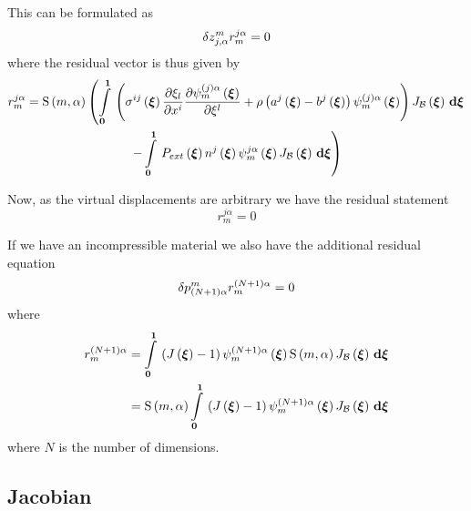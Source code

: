 This can be formulated as
\begin{equation}
  \variationdir{z_{j,\alpha}^{m}}r_{m}^{j\alpha}=0
\end{equation}
where the residual vector is thus given by
\begin{multline}
  r_{m}^{j\alpha}=\gsf{m}{\alpha}\left(
    \gint{\vectr{0}}{\vectr{1}}{\pbrac{\fnof{\sigma^{ij}}{\vectr{\xi}}\delby{\xi_{l}}{x^{i}}\delby{
          \idxgbfn{\pbrac{j}}{m}{\alpha}{\vectr{\xi}}}{\xi^{l}}+\rho\pbrac{
        \fnof{a^{j}}{\vectr{\xi}}-\fnof{b^{j}}{\vectr{\xi}}}\idxgbfn{\pbrac{j}}{m}{\alpha}{\vectr{\xi}}}
      \fnof{J_{\embedmanifold{B}}}{\vectr{\xi}}}{\vectr{\xi}}\right. \\
    \left.-\gint{\vectr{0}}{\vectr{1}}{\fnof{P_{ext}}{\vectr{\xi}}\fnof{n^{j}}{\vectr{\xi}}
      \idxgbfn{j}{m}{\alpha}{\vectr{\xi}}
      \fnof{J_{\embedmanifold{B}}}{\vectr{\xi}}}{\vectr{\xi}}\right)
\end{multline}

Now, as the virtual displacements are arbitrary we have the residual statement
\begin{equation}
  r_{m}^{j\alpha}=0
\end{equation}

If we have an incompressible material we also have the additional residual
equation
\begin{equation}
  \variationdir{p_{\pbrac{N+1}\alpha}^{m}}r_{m}^{\pbrac{N+1}\alpha}=0
\end{equation}
where 
\begin{equation}
  \begin{split}
    r_{m}^{\pbrac{N+1}\alpha}&=\gint{\vectr{0}}{\vectr{1}}{\pbrac{\fnof{J}{\vectr{\xi}}-1}
        \idxgbfn{\pbrac{N+1}}{m}{\alpha}{\vectr{\xi}}\gsf{m}{\alpha}\fnof{J_{\embedmanifold{B}}}{\vectr{\xi}}}{\vectr{\xi}}
    \\
    &=\gsf{m}{\alpha}\gint{\vectr{0}}{\vectr{1}}{\pbrac{\fnof{J}{\vectr{\xi}} -
        1}\idxgbfn{\pbrac{N+1}}{m}{\alpha}{\vectr{\xi}}\fnof{J_{\embedmanifold{B}}}{\vectr{\xi}}}{\vectr{\xi}}
  \end{split}
\end{equation}
where $N$ is the number of dimensions.

\subsection{Jacobian}

